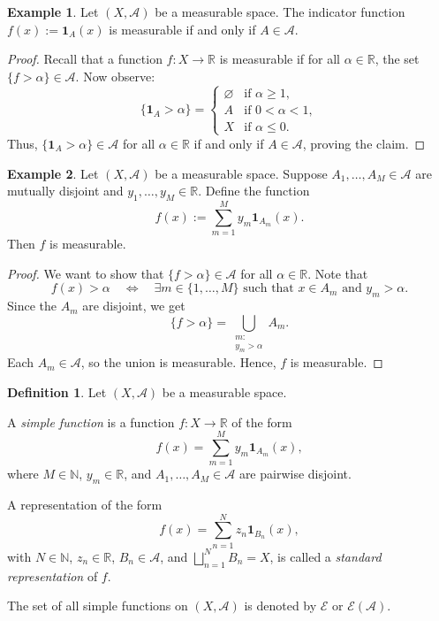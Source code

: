 \documentclass[12pt]{article}
\theoremstyle{definition}
\newtheorem{definition}{Definition}[section]
\newtheorem{example}{Example}[section]
\begin{document}
\medskip
\begin{example}
Let \( (X, \mathcal{A}) \) be a measurable space.  
The indicator function \( f(x) := \mathbf{1}_A(x) \) is measurable if and only if \( A \in \mathcal{A} \).

\begin{proof}
Recall that a function \( f : X \to \mathbb{R} \) is measurable if for all \( \alpha \in \mathbb{R} \), the set \( \{ f > \alpha \} \in \mathcal{A} \).  
Now observe:
\[
\{ \mathbf{1}_A > \alpha \} =
\begin{cases}
\varnothing & \text{if } \alpha \geq 1, \\
A & \text{if } 0 < \alpha < 1, \\
X & \text{if } \alpha \leq 0.
\end{cases}
\]
Thus, \( \{ \mathbf{1}_A > \alpha \} \in \mathcal{A} \) for all \( \alpha \in \mathbb{R} \) if and only if \( A \in \mathcal{A} \), proving the claim.
\end{proof}
\end{example}

\medskip
\begin{example}
Let \( (X, \mathcal{A}) \) be a measurable space.  
Suppose \( A_1, \dots, A_M \in \mathcal{A} \) are mutually disjoint and \( y_1, \dots, y_M \in \mathbb{R} \).  
Define the function
\[
f(x) := \sum_{m=1}^M y_m \mathbf{1}_{A_m}(x).
\]
Then \( f \) is measurable.

\begin{proof}
We want to show that \( \{ f > \alpha \} \in \mathcal{A} \) for all \( \alpha \in \mathbb{R} \).  
Note that
\[
f(x) > \alpha \quad \Leftrightarrow \quad \exists m \in \{1, \dots, M\} \text{ such that } x \in A_m \text{ and } y_m > \alpha.
\]
Since the \( A_m \) are disjoint, we get
\[
\{ f > \alpha \} = \bigcup_{\substack{m :\\ y_m > \alpha}} A_m.
\]
Each \( A_m \in \mathcal{A} \), so the union is measurable. Hence, \( f \) is measurable.
\end{proof}
\end{example}

\medskip
\begin{definition}
Let \( (X, \mathcal{A}) \) be a measurable space.

A \emph{simple function} is a function \( f : X \to \mathbb{R} \) of the form
\[
f(x) = \sum_{m=1}^{M} y_m \mathbf{1}_{A_m}(x),
\]
where \( M \in \mathbb{N} \), \( y_m \in \mathbb{R} \), and \( A_1, \dots, A_M \in \mathcal{A} \) are pairwise disjoint.

A representation of the form
\[
f(x) = \sum_{n=1}^{N} z_n \mathbf{1}_{B_n}(x),
\]
with \( N \in \mathbb{N} \), \( z_n \in \mathbb{R} \), \( B_n \in \mathcal{A} \), and \( \bigsqcup_{n=1}^N B_n = X \), is called a \emph{standard representation} of \( f \).

The set of all simple functions on \( (X, \mathcal{A}) \) is denoted by \( \mathcal{E} \) or \( \mathcal{E}(\mathcal{A}) \).
\end{definition}
\end{document}
